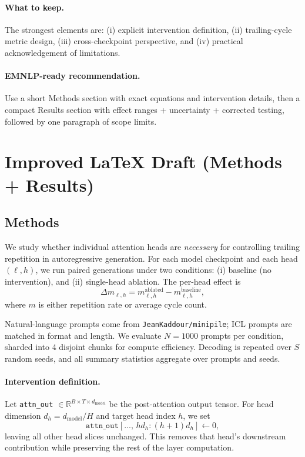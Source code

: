 \documentclass[11pt]{article}
\begin{document}
\paragraph{What to keep.}
The strongest elements are: (i) explicit intervention definition, (ii) trailing-cycle metric design, (iii) cross-checkpoint perspective, and (iv) practical acknowledgement of limitations.

\paragraph{EMNLP-ready recommendation.}
Use a short Methods section with exact equations and intervention details, then a compact Results section with effect ranges + uncertainty + corrected testing, followed by one paragraph of scope limits.

\section{Improved LaTeX Draft (Methods + Results)}

\subsection{Methods}
We study whether individual attention heads are \emph{necessary} for controlling trailing repetition in autoregressive generation. For each model checkpoint and each head $(\ell,h)$, we run paired generations under two conditions: (i) baseline (no intervention), and (ii) single-head ablation. The per-head effect is
\begin{equation}
\Delta m_{\ell,h} = m_{\ell,h}^{\text{ablated}} - m_{\ell,h}^{\text{baseline}},
\end{equation}
where $m$ is either repetition rate or average cycle count.

Natural-language prompts come from \texttt{JeanKaddour/minipile}; ICL prompts are matched in format and length. We evaluate $N=1000$ prompts per condition, sharded into 4 disjoint chunks for compute efficiency. Decoding is repeated over $S$ random seeds, and all summary statistics aggregate over prompts and seeds.

\paragraph{Intervention definition.}
Let \texttt{attn\_out} $\in \mathbb{R}^{B\times T\times d_{\text{model}}}$ be the post-attention output tensor. For head dimension $d_h=d_{\text{model}}/H$ and target head index $h$, we set
\begin{equation}
\texttt{attn\_out}[...,\, h d_h : (h+1)d_h] \leftarrow 0,
\end{equation}
leaving all other head slices unchanged. This removes that head's downstream contribution while preserving the rest of the layer computation.
\end{document}
